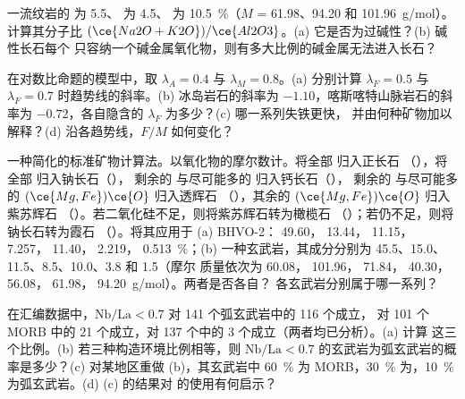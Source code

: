 \begin{exercise}[$\star\star$]\label{exo:b2:magmatic-series:9}
一流纹岩的  为 5.5、 为 4.5、 为 \qty{10.5}{\percent}（$M$ =
61.98、94.20 和 \qty{101.96}{g/mol}）。计算其分子比 $(\ce{Na2O +
K2O})/\ce{Al2O3}$。(a) 它是否为过碱性？(b) 碱性长石每个 
只容纳一个碱金属氧化物，则有多大比例的碱金属无法进入长石？
\end{exercise}

\begin{exercise}[$\star\star\star$]\label{exo:b2:magmatic-series:10}
在对数比命题的模型中，取 $\lambda_A = 0.4$ 与 $\lambda_M =
0.8$。(a) 分别计算 $\lambda_F = 0.5$ 与 $\lambda_F =
0.7$ 时趋势线的斜率。(b) 冰岛岩石的斜率为 $-1.10$，喀斯喀特山脉岩石的斜率为
$-0.72$，各自隐含的 $\lambda_F$ 为多少？(c) 哪一系列失铁更快，
并由何种矿物加以解释？(d) 沿各趋势线，$F/M$ 如何变化？
\end{exercise}

\begin{exercise}[$\star\star\star$]\label{exo:b2:magmatic-series:11}
一种简化的标准矿物计算法。以氧化物的摩尔数计。将全部  归入正长石
（），将全部  归入钠长石（），
剩余的  与尽可能多的  归入钙长石（），
剩余的  与尽可能多的 $(\ce{Mg,Fe})\ce{O}$ 归入透辉石
（），其余的 $(\ce{Mg,Fe})\ce{O}$ 归入紫苏辉石
（）。若二氧化硅不足，则将紫苏辉石转为橄榄石
（）；若仍不足，则将钠长石转为霞石
（）。将其应用于 (a) BHVO-2： 49.60， 13.44，
 11.15， 7.257， 11.40， 2.219，
\qty{0.513}{\percent}；(b) 一种玄武岩，其成分分别为 45.5、15.0、11.5、8.5、10.0、3.8 和 1.5（摩尔
质量依次为  60.08， 101.96， 71.84， 40.30，
56.08， 61.98， \qty{94.20}{g/mol}）。两者是否各自？
各玄武岩分别属于哪一系列？
\end{exercise}

\begin{exercise}[$\star\star\star$]\label{exo:b2:magmatic-series:12}
在汇编数据中，$\mathrm{Nb}/\mathrm{La} < 0.7$ 对 141 个弧玄武岩中的 116 个成立，
对 101 个 MORB 中的 21 个成立，对 137 个中的 3 个成立（两者均已分析）。(a) 计算
这三个比例。(b) 若三种构造环境比例相等，则
$\mathrm{Nb}/\mathrm{La} < 0.7$ 的玄武岩为弧玄武岩的概率是多少？(c)
对某地区重做 (b)，其玄武岩中 \qty{60}{\percent} 为 MORB，\qty{30}{\percent}
为，\qty{10}{\percent} 为弧玄武岩。(d) (c) 的结果对
的使用有何启示？
\end{exercise}

